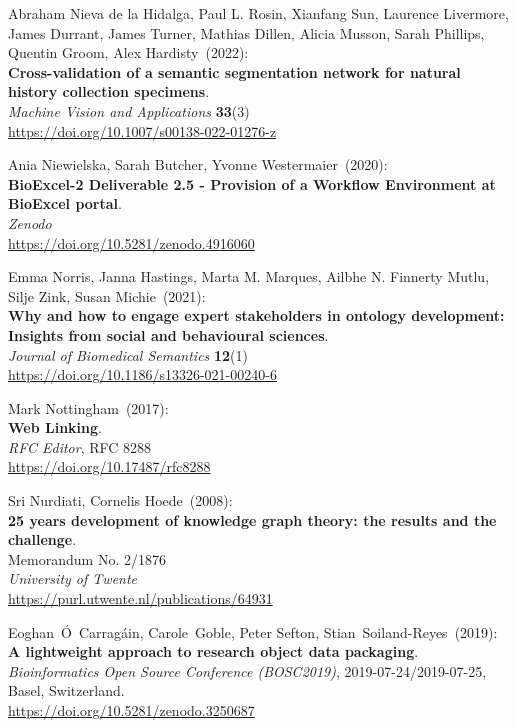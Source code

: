 \begin{thebibliography}{9}
Abraham Nieva de la Hidalga, Paul L. Rosin, Xianfang Sun, Laurence Livermore, James Durrant, James Turner, Mathias Dillen, Alicia Musson, Sarah Phillips, Quentin Groom, Alex Hardisty~(2022): \\
\textbf{Cross-validation of a semantic segmentation network for natural history collection specimens}.\\
\emph{Machine Vision and Applications} \textbf{33}(3)\\
\url{https://doi.org/10.1007/s00138-022-01276-z}

Ania Niewielska, Sarah Butcher, Yvonne Westermaier~(2020): \\
\textbf{BioExcel-2 Deliverable 2.5 - Provision of a Workflow Environment
at BioExcel portal}.\\
\emph{Zenodo}\\
\url{https://doi.org/10.5281/zenodo.4916060}

Emma Norris, Janna Hastings, Marta M. Marques, Ailbhe N. Finnerty Mutlu,
Silje Zink, Susan Michie~(2021): \\
\textbf{Why and how to engage expert
stakeholders in ontology development: Insights from social and
behavioural sciences}. \\
\emph{Journal of Biomedical Semantics} \textbf{12}(1) \\
\url{https://doi.org/10.1186/s13326-021-00240-6}

Mark Nottingham~(2017): \\
\textbf{Web {Linking}}.\\
\emph{RFC Editor}, RFC 8288\\
\url{https://doi.org/10.17487/rfc8288}

Sri Nurdiati, Cornelis Hoede~(2008): \\
\textbf{25 years development of knowledge graph theory: the results and the challenge}.\\
Memorandum No. 2/1876\\
\emph{University of Twente}\\
\url{https://purl.utwente.nl/publications/64931}

Eoghan~Ó~Carragáin, Carole~Goble, Peter Sefton,
Stian~Soiland-Reyes~(2019): \\
\textbf{A lightweight approach to research object data packaging}.\\
\emph{Bioinformatics Open Source Conference (BOSC2019)},
2019-07-24/2019-07-25, Basel, Switzerland.\\
\url{https://doi.org/10.5281/zenodo.3250687}


\end{thebibliography}
